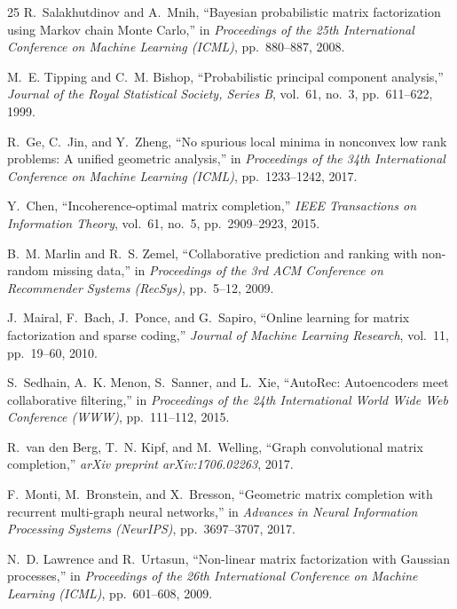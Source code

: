 \documentclass[conference]{IEEEtran}
\begin{document}
\begin{thebibliography}{25}
R.~Salakhutdinov and A.~Mnih,
``Bayesian probabilistic matrix factorization using Markov chain Monte Carlo,''
in \emph{Proceedings of the 25th International Conference on Machine Learning (ICML)},
pp.~880--887, 2008.

M.~E. Tipping and C.~M. Bishop,
``Probabilistic principal component analysis,''
\emph{Journal of the Royal Statistical Society, Series B},
vol.~61, no.~3, pp.~611--622, 1999.

R.~Ge, C.~Jin, and Y.~Zheng,
``No spurious local minima in nonconvex low rank problems: A unified geometric analysis,''
in \emph{Proceedings of the 34th International Conference on Machine Learning (ICML)},
pp.~1233--1242, 2017.

Y.~Chen,
``Incoherence-optimal matrix completion,''
\emph{IEEE Transactions on Information Theory},
vol.~61, no.~5, pp.~2909--2923, 2015.

B.~M. Marlin and R.~S. Zemel,
``Collaborative prediction and ranking with non-random missing data,''
in \emph{Proceedings of the 3rd ACM Conference on Recommender Systems (RecSys)},
pp.~5--12, 2009.

J.~Mairal, F.~Bach, J.~Ponce, and G.~Sapiro,
``Online learning for matrix factorization and sparse coding,''
\emph{Journal of Machine Learning Research},
vol.~11, pp.~19--60, 2010.

S.~Sedhain, A.~K. Menon, S.~Sanner, and L.~Xie,
``AutoRec: Autoencoders meet collaborative filtering,''
in \emph{Proceedings of the 24th International World Wide Web Conference (WWW)},
pp.~111--112, 2015.

R.~van den Berg, T.~N. Kipf, and M.~Welling,
``Graph convolutional matrix completion,''
\emph{arXiv preprint arXiv:1706.02263}, 2017.

F.~Monti, M.~Bronstein, and X.~Bresson,
``Geometric matrix completion with recurrent multi-graph neural networks,''
in \emph{Advances in Neural Information Processing Systems (NeurIPS)},
pp.~3697--3707, 2017.

N.~D. Lawrence and R.~Urtasun,
``Non-linear matrix factorization with Gaussian processes,''
in \emph{Proceedings of the 26th International Conference on Machine Learning (ICML)},
pp.~601--608, 2009.

\end{thebibliography}
\end{document}
